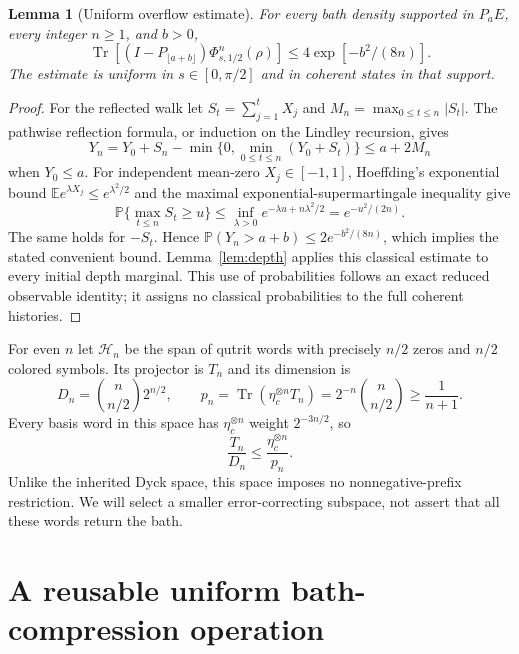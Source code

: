 \documentclass[11pt]{article}
\newtheorem{lemma}[theorem]{Lemma}
\newcommand{\Tr}{\operatorname{Tr}}
\newcommand{\Prob}{\mathbb P}
\newcommand{\E}{\mathbb E}
\begin{document}
\begin{lemma}[Uniform overflow estimate]\label{lem:tail}
For every bath density supported in $P_aE$, every integer $n\ge1$, and $b>0$,
\begin{equation}
 \Tr[(I-P_{\lfloor a+b\rfloor})\Phi_{s,1/2}^n(\rho)]
 \le4\exp[-b^2/(8n)].\label{eq:tail}
\end{equation}
The estimate is uniform in $s\in[0,\pi/2]$ and in coherent states in that support.
\end{lemma}
\begin{proof}
For the reflected walk let $S_t=\sum_{j=1}^tX_j$ and $M_n=\max_{0\le t\le n}|S_t|$. The pathwise reflection formula, or induction on the Lindley recursion, gives
\[
 Y_n=Y_0+S_n-\min\{0,\min_{0\le t\le n}(Y_0+S_t)\}
 \le a+2M_n
\]
when $Y_0\le a$. For independent mean-zero $X_j\in[-1,1]$, Hoeffding's exponential bound $\E e^{\lambda X_j}\le e^{\lambda^2/2}$ and the maximal exponential-supermartingale inequality give
\[
 \Prob\{\max_{t\le n}S_t\ge u\}\le\inf_{\lambda>0}e^{-\lambda u+n\lambda^2/2}
 =e^{-u^2/(2n)}.
\]
The same holds for $-S_t$. Hence $\Prob(Y_n>a+b)\le2e^{-b^2/(8n)}$, which implies the stated convenient bound. Lemma~\ref{lem:depth} applies this classical estimate to every initial depth marginal. This use of probabilities follows an exact reduced observable identity; it assigns no classical probabilities to the full coherent histories.
\end{proof}

For even $n$ let $\mathcal H_n$ be the span of qutrit words with precisely $n/2$ zeros and $n/2$ colored symbols. Its projector is $T_n$ and its dimension is
\begin{equation}
 D_n=\binom n{n/2}2^{n/2},\qquad
 p_n=\Tr(\eta_c^{\otimes n}T_n)=2^{-n}\binom n{n/2}\ge\frac1{n+1}.
 \label{eq:type}
\end{equation}
Every basis word in this space has $\eta_c^{\otimes n}$ weight $2^{-3n/2}$, so
\begin{equation}
 \frac{T_n}{D_n}\le\frac{\eta_c^{\otimes n}}{p_n}.
 \label{eq:domination}
\end{equation}
Unlike the inherited Dyck space, this space imposes no nonnegative-prefix restriction. We will select a smaller error-correcting subspace, not assert that all these words return the bath.

\section{A reusable uniform bath-compression operation}\label{sec:compression}
\end{document}
